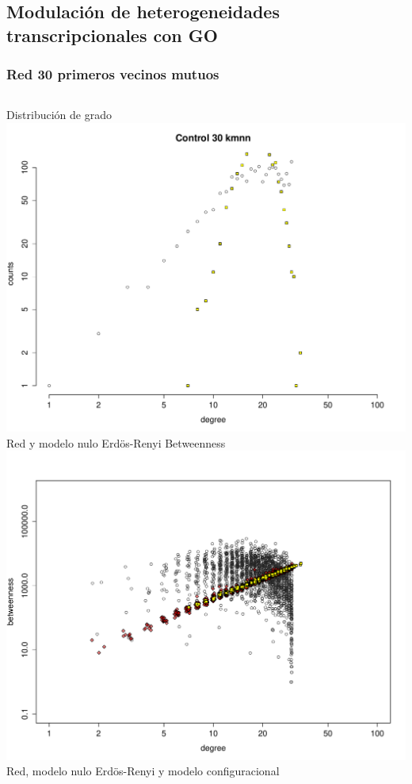 \documentclass[serif,9pt, t]{beamer}
\begin{document}
\subsection{Modulación de heterogeneidades
transcripcionales con GO}
\begin{frame}\frametitle{Red 30 primeros vecinos mutuos} 
\bigskip
\begin{columns}[T]
	\centering
    Distribución de grado\\	
    \bigskip
    \includegraphics[width=1\textwidth]{erdos_renyi_vs_30kmnn.pdf}\\
    Red y modelo nulo Erdös-Renyi
    \centering
    Betweenness\\
    \bigskip
    \includegraphics[width=1\textwidth]{betweenness_er_30_conf.pdf}\\
    Red, modelo nulo Erdös-Renyi y modelo configuracional
\end{columns}
\end{frame}
\end{document}
